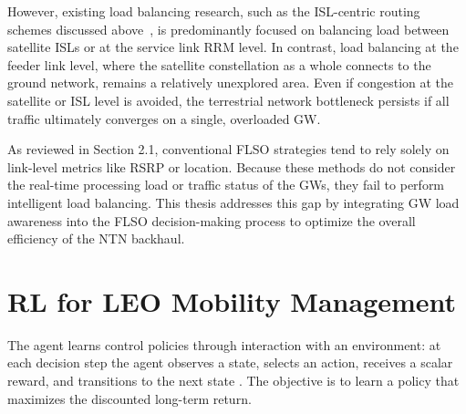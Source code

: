 However, existing load balancing research, such as the ISL-centric routing schemes discussed above~\cite{roth2022sdn,deng2023dbpr,liu2023atlb}, is predominantly focused on balancing load between satellite ISLs or at the service link RRM level. In contrast, load balancing at the feeder link level, where the satellite constellation as a whole connects to the ground network, remains a relatively unexplored area. Even if congestion at the satellite or ISL level is avoided, the terrestrial network bottleneck persists if all traffic ultimately converges on a single, overloaded GW. %

As reviewed in Section 2.1, conventional FLSO strategies tend to rely solely on link-level metrics like RSRP or location. Because these methods do not consider the real-time processing load or traffic status of the GWs, they fail to perform intelligent load balancing. This thesis addresses this gap by integrating GW load awareness into the FLSO decision-making process to optimize the overall efficiency of the NTN backhaul. %

\section[RL for LEO Mobility Management]{RL for LEO Mobility Management}
\label{sec:rl_mobility}
\quad The agent learns control policies through interaction with an environment: at each decision step the agent observes a state, selects an action, receives a scalar reward, and transitions to the next state \cite{wang2016dueling}. The objective is to learn a policy that maximizes the discounted long-term return. 


